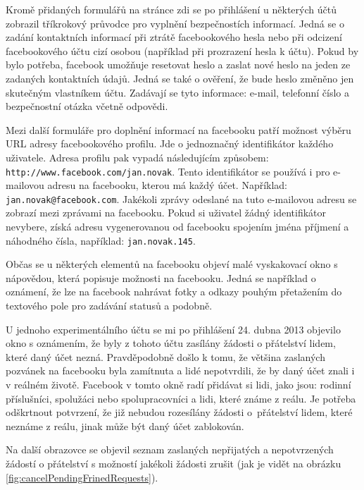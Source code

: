 \documentclass[thesis=M,czech]{FITthesis}[2013/05/10]
\begin{document}
Kromě přidaných formulářů na stránce zdi se po přihlášení u některých účtů zobrazil tříkrokový průvodce pro vyplnění bezpečnostích informací. Jedná se o zadání kontaktních informací při ztrátě facebookového hesla nebo při odcizení facebookového účtu cizí osobou (například při prozrazení hesla k účtu). Pokud by bylo potřeba, facebook umožňuje resetovat heslo a zaslat nové heslo na jeden ze zadaných kontaktních údajů. Jedná se také o ověření, že bude heslo změněno jen skutečným vlastníkem účtu. Zadávají se tyto informace: e-mail, telefonní číslo a bezpečnostní otázka včetně odpovědi. 

Mezi další formuláře pro doplnění informací na facebooku patří možnost výběru URL adresy facebookového profilu. Jde o jednoznačný identifikátor každého uživatele. Adresa profilu pak vypadá následujícím způsobem: \verb|http://www.facebook.com/jan.novak|. Tento identifikátor se používá i pro e-mailovou adresu na facebooku, kterou má každý účet. Například: \verb|jan.novak@facebook.com|. Jakékoli zprávy odeslané na tuto e-mailovou adresu se zobrazí mezi zprávami na facebooku. Pokud si uživatel žádný identifikátor nevybere, získá adresu vygenerovanou od facebooku spojením jména příjmení a náhodného čísla, například: \verb|jan.novak.145|.

Občas se u některých elementů na facebooku objeví malé vyskakovací okno s nápovědou, která popisuje možnosti na facebooku. Jedná se například o oznámení, že lze na facebook nahrávat fotky a odkazy pouhým přetažením do textového pole pro zadávání statusů a podobně. 

U jednoho experimentálního účtu se mi po přihlášení 24. dubna 2013 objevilo okno s oznámením, že byly z tohoto účtu zasílány žádosti o přátelství lidem, které daný účet nezná. Pravděpodobně došlo k tomu, že většina zaslaných pozvánek na facebooku byla zamítnuta a lidé nepotvrdili, že by daný účet znali i v reálném životě. Facebook v tomto okně radí přidávat si lidi, jako jsou: rodinní příslušníci, spolužáci nebo spolupracovníci a lidi, které známe z reálu. Je potřeba odškrtnout potvrzení, že již nebudou rozesílány žádosti o~přátelství lidem, které neznáme z reálu, jinak může být daný účet zablokován.

Na další obrazovce se objevil seznam zaslaných nepřijatých a nepotvrzených žádostí o přátelství s možností jakékoli žádosti zrušit (jak je vidět na obrázku \ref{fig:cancelPendingFrinedRequests}).
\end{document}
